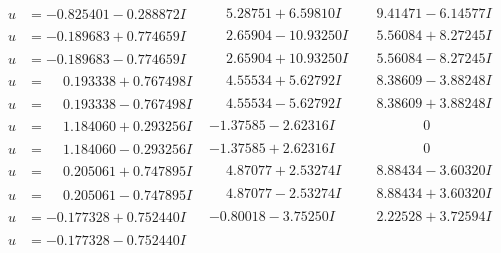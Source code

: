 \documentclass[1p]{elsarticle_modified}
\theoremstyle{definition}
\begin{document}
$$\begin{array}{c|c|c}
\begin{aligned}
u &= -0.825401 - 0.288872 I\end{aligned}
 & \phantom{-}5.28751 + 6.59810 I & \phantom{-}9.41471 - 6.14577 I \\ \hline\begin{aligned}
u &= -0.189683 + 0.774659 I\end{aligned}
 & \phantom{-}2.65904 - 10.93250 I & \phantom{-}5.56084 + 8.27245 I \\ \hline\begin{aligned}
u &= -0.189683 - 0.774659 I\end{aligned}
 & \phantom{-}2.65904 + 10.93250 I & \phantom{-}5.56084 - 8.27245 I \\ \hline\begin{aligned}
u &= \phantom{-}0.193338 + 0.767498 I\end{aligned}
 & \phantom{-}4.55534 + 5.62792 I & \phantom{-}8.38609 - 3.88248 I \\ \hline\begin{aligned}
u &= \phantom{-}0.193338 - 0.767498 I\end{aligned}
 & \phantom{-}4.55534 - 5.62792 I & \phantom{-}8.38609 + 3.88248 I \\ \hline\begin{aligned}
u &= \phantom{-}1.184060 + 0.293256 I\end{aligned}
 & -1.37585 - 2.62316 I & \phantom{-0.000000 } 0 \\ \hline\begin{aligned}
u &= \phantom{-}1.184060 - 0.293256 I\end{aligned}
 & -1.37585 + 2.62316 I & \phantom{-0.000000 } 0 \\ \hline\begin{aligned}
u &= \phantom{-}0.205061 + 0.747895 I\end{aligned}
 & \phantom{-}4.87077 + 2.53274 I & \phantom{-}8.88434 - 3.60320 I \\ \hline\begin{aligned}
u &= \phantom{-}0.205061 - 0.747895 I\end{aligned}
 & \phantom{-}4.87077 - 2.53274 I & \phantom{-}8.88434 + 3.60320 I \\ \hline\begin{aligned}
u &= -0.177328 + 0.752440 I\end{aligned}
 & -0.80018 - 3.75250 I & \phantom{-}2.22528 + 3.72594 I \\ \hline\begin{aligned}
u &= -0.177328 - 0.752440 I\end{aligned}

\end{array}$$
\end{document}
